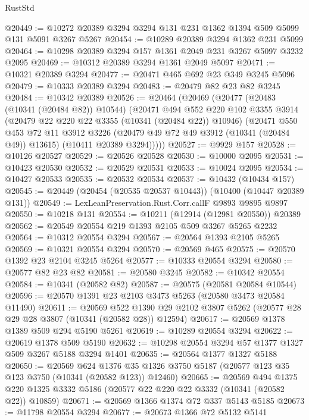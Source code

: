 \begin{lexlean}{RustStd}
\begin{coremodule}
@20449 := @10272 @20389 @3294 @3294 @131 @231 @1362 @1394 @509 @5099 @131 @5091 @3267 @5267
@20454 := @10289 @20389 @3294 @1362 @231 @5099
@20464 := @10298 @20389 @3294 @157 @1361 @2049 @231 @3267 @5097 @3232 @2095
@20469 := @10312 @20389 @3294 @1361 @2049 @5097
@20471 := @10321 @20389 @3294
@20477 := @20471 @465 @692 @23 @349 @3245 @5096
@20479 := @10333 @20389 @3294
@20483 := @20479 @82 @23 @82 @3245
@20484 := @10342 @20389
@20526 := @20464
    (@20469
      (@20477
        (@20483 (@10341 (@20484 @82)) @10544)
        (@20471
          @494
          @552
          @220
          @102
          @3355
          @3914
          (@20479 @22 @220 @22 @3355 (@10341 (@20484 @22)) @10946)
          (@20471
            @550
            @453
            @72
            @11
            @3912
            @3226
            (@20479 @49 @72 @49 @3912 (@10341 (@20484 @49)) @13615)
            (@10411 @20389 @3294)))))
@20527 := @9929 @157
@20528 := @10126 @20527
@20529 := @20526 @20528
@20530 := @10000 @2095
@20531 := @10423 @20530
@20532 := @20529 @20531
@20533 := @10024 @2095
@20534 := @10427 @20533
@20535 := @20532 @20534
@20537 := @10432 (@10434 @157)
@20545 := @20449 (@20454 (@20535 @20537 @10443)) (@10400 (@10447 @20389 @131))
@20549 := LexLeanPreservation.Rust.Corr.callF @9893 @9895 @9897
@20550 := @10218 @131
@20554 := @10211 (@12914 (@12981 @20550)) @20389
@20562 := @20549 @20554 @219 @1393 @2105 @509 @3267 @5265 @2232
@20564 := @10312 @20554 @3294
@20567 := @20564 @1393 @2105 @5265
@20569 := @10321 @20554 @3294
@20570 := @20569 @465
@20575 := @20570 @1392 @23 @2104 @3245 @5264
@20577 := @10333 @20554 @3294
@20580 := @20577 @82 @23 @82
@20581 := @20580 @3245
@20582 := @10342 @20554
@20584 := @10341 (@20582 @82)
@20587 := @20575 (@20581 @20584 @10544)
@20596 := @20570 @1391 @23 @2103 @3473 @5263 (@20580 @3473 @20584 @11490)
@20611 := @20569
    @522
    @1390
    @29
    @2102
    @3807
    @5262
    (@20577 @28 @29 @28 @3807 (@10341 (@20582 @28)) @12594)
@20617 := @20569 @1378 @1389 @509 @294 @5190 @5261
@20619 := @10289 @20554 @3294
@20622 := @20619 @1378 @509 @5190
@20632 := @10298 @20554 @3294 @57 @1377 @1327 @509 @3267 @5188 @3294 @1401
@20635 := @20564 @1377 @1327 @5188
@20650 := @20569
    @624
    @1376
    @35
    @1326
    @3750
    @5187
    (@20577 @123 @35 @123 @3750 (@10341 (@20582 @123)) @12460)
@20665 := @20569
    @494
    @1375
    @220
    @1325
    @3332
    @5186
    (@20577 @22 @220 @22 @3332 (@10341 (@20582 @22)) @10859)
@20671 := @20569 @1366 @1374 @72 @337 @5143 @5185
@20673 := @11798 @20554 @3294
@20677 := @20673 @1366 @72 @5132 @5141

\end{coremodule}
\end{lexlean}
